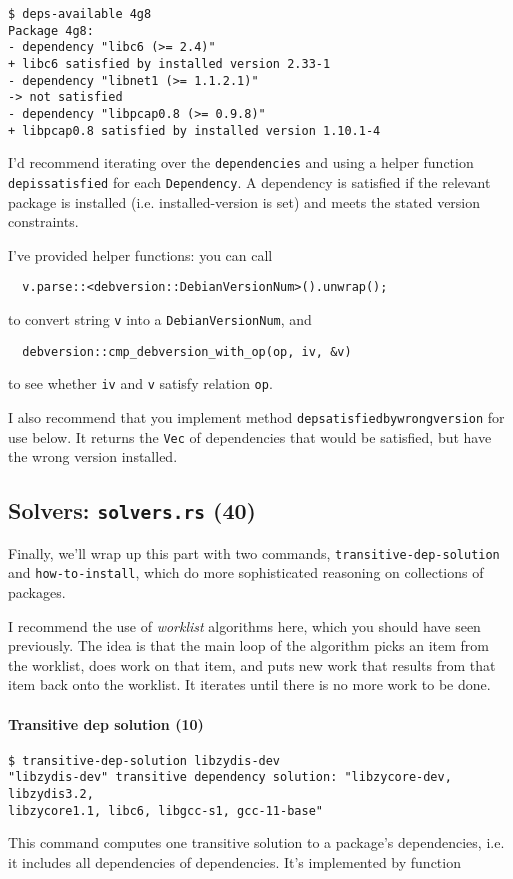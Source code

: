 \documentclass[12pt]{article}
\renewcommand{\_}{\kern-1.5pt\textunderscore\kern-1.5pt}
\begin{document}
\begin{verbatim}
$ deps-available 4g8
Package 4g8:
- dependency "libc6 (>= 2.4)"
+ libc6 satisfied by installed version 2.33-1
- dependency "libnet1 (>= 1.1.2.1)"
-> not satisfied
- dependency "libpcap0.8 (>= 0.9.8)"
+ libpcap0.8 satisfied by installed version 1.10.1-4
\end{verbatim}
I'd recommend iterating over the \texttt{dependencies} and using a helper function \texttt{dep\_is\_satisfied}
for each \texttt{Dependency}. A dependency is satisfied if the relevant package is installed (i.e. installed-version
is set) and meets the stated version constraints. 

\vspace{1em}
I've provided helper functions: you can call 
\begin{verbatim}
  v.parse::<debversion::DebianVersionNum>().unwrap();
\end{verbatim}
to convert string \texttt{v} into a \texttt{DebianVersionNum}, and 
\begin{verbatim}
  debversion::cmp_debversion_with_op(op, iv, &v)
\end{verbatim}
to see whether \texttt{iv} and \texttt{v} satisfy relation \texttt{op}.

\vspace{1em}
I also recommend that you implement method \texttt{dep\_satisfied\_by\_wrong\_version} for use below.
It returns the \texttt{Vec} of dependencies that would be satisfied, but have the wrong version installed.

\subsection*{Solvers: \texttt{solvers.rs} (40)}

Finally, we'll wrap up this part with two commands, \texttt{transitive-dep-solution} and \texttt{how-to-install},
which do more sophisticated reasoning on collections of packages.

\vspace{1em}
I recommend the use of \emph{worklist} algorithms here, which you should have seen previously.
The idea is that the main loop of the algorithm picks an item from the worklist, does work on that
item, and puts new work that results from that item back onto the worklist. It iterates until there
is no more work to be done.

\paragraph{Transitive dep solution (10)}
\begin{verbatim}
$ transitive-dep-solution libzydis-dev
"libzydis-dev" transitive dependency solution: "libzycore-dev, libzydis3.2, 
libzycore1.1, libc6, libgcc-s1, gcc-11-base"
\end{verbatim}
This command computes one transitive solution to a package's dependencies, i.e. it includes all 
dependencies of dependencies. It's implemented by function 
\end{document}

